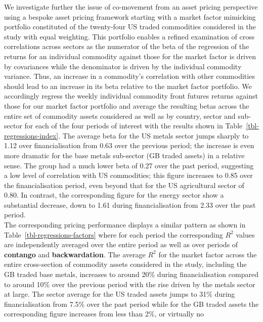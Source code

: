 \documentclass[
  authoryear,
  preprint,
  3p]{elsarticle}
\begin{document}
\medskip

We investigate further the issue of co-movement from an asset pricing
perspective using a bespoke asset pricing framework starting with a
market factor mimicking portfolio constituted of the twenty-four US
traded commodities considered in the study with equal weighting. This
portfolio enables a refined examination of cross correlations across
sectors as the numerator of the beta of the regression of the returns
for an individual commodity against those for the market factor is
driven by covariances while the denominator is driven by the individual
commodity variance. Thus, an increase in a commodity's correlation with
other commodities should lead to an increase in its beta relative to the
market factor portfolio. We accordingly regress the weekly individual
commodity front futures returns against those for our market factor
portfolio and average the resulting betas across the entire set of
commodity assets considered as well as by country, sector and sub-sector
for each of the four periods of interest with the results shown in
Table~\ref{tbl-regressions-index}. The average beta for the US metals
sector jumps sharply to 1.12 over financialisation from 0.63 over the
previous period; the increase is even more dramatic for the base metals
sub-sector (GB traded assets) in a relative sense. The group had a much
lower beta of 0.27 over the past period, suggesting a low level of
correlation with US commodities; this figure increases to 0.85 over the
financialisation period, even beyond that for the US agricultural sector
of 0.80. In contrast, the corresponding figure for the energy sector
show a substantial decrease, down to 1.61 during financialisation from
2.33 over the past period.\\
The corresponding pricing performance displays a similar pattern as
shown in Table~\ref{tbl-regressions-factors} where for each period the
corresponding \(R^{2}\) values are independently averaged over the
entire period as well as over periods of \textbf{contango} and
\textbf{backwardation}. The average \(R^{2}\) for the market factor
across the entire cross-section of commodity assets considered in the
study, including the GB traded base metals, increases to around 20\%
during financialisation compared to around 10\% over the previous period
with the rise driven by the metals sector at large. The sector average
for the US traded assets jumps to 31\% during financialisation from
7.5\% over the past period while for the GB traded assets the
corresponding figure increases from less than 2\%, or virtually no
\end{document}
